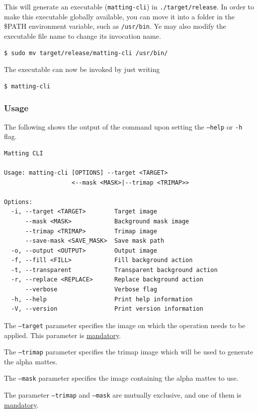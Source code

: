 \documentclass[a4paper]{article}
\begin{document}
This will generate an executable (\texttt{matting-cli})
in \texttt{./target/release}.
In order to make this executable globally available,
you can move it into a folder in the \textsc{\$PATH} environment
variable, such as \texttt{/usr/bin}.
Ye may also modify the executable file name to change its invocation
name.

\begin{lstlisting}[style=boxed]
    $ sudo mv target/release/matting-cli /usr/bin/
\end{lstlisting}

The executable can now be invoked by just writing
\begin{lstlisting}[style=boxed]
    $ matting-cli
\end{lstlisting}

\subsubsection{Usage}

The following shows the output of the command upon
setting the \texttt{--help} or \texttt{-h} flag.
\begin{lstlisting}[style=boxed]
Matting CLI

Usage: matting-cli [OPTIONS] --target <TARGET>
                   <--mask <MASK>|--trimap <TRIMAP>>

Options:
  -i, --target <TARGET>        Target image
      --mask <MASK>            Background mask image
      --trimap <TRIMAP>        Trimap image
      --save-mask <SAVE_MASK>  Save mask path
  -o, --output <OUTPUT>        Output image
  -f, --fill <FILL>            Fill background action
  -t, --transparent            Transparent background action
  -r, --replace <REPLACE>      Replace background action
      --verbose                Verbose flag
  -h, --help                   Print help information
  -V, --version                Print version information
\end{lstlisting}

The \texttt{--target} parameter specifies the image
on which the operation needs to be applied.
This parameter is \underline{mandatory}.

The \texttt{--trimap} parameter specifies the trimap
image which will be used to generate the alpha mattes.

The \texttt{--mask} parameter specifies the image
containing the alpha mattes to use.

The parameter \texttt{--trimap} and \texttt{--mask}
are mutually exclusive, and one of them is \underline{mandatory}.
\end{document}
